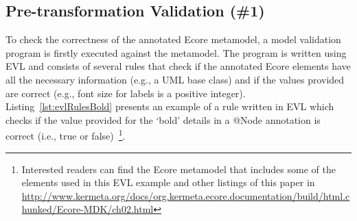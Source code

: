 \subsection{Pre-transformation Validation (\#1)}
To check the correctness of the annotated Ecore metamodel, a model validation program is firstly executed against the metamodel.
The program is written using EVL and consists of several rules that check if the annotated Ecore elements have all the necessary information (e.g., a UML base class) and if the values provided are correct (e.g., font size for labels is a positive integer). 
Listing~\ref{lst:evlRulesBold} presents an example of a rule written in EVL which checks if the value provided for the `bold' details in a @Node annotation is correct (i.e., true or false)~\footnote{Interested readers can find the Ecore metamodel that includes some of the elements used in this EVL example and other listings of this paper in \url{http://www.kermeta.org/docs/org.kermeta.ecore.documentation/build/html.chunked/Ecore-MDK/ch02.html}}.



